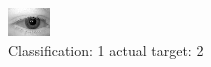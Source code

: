 \begin{figure}[h!]
\begin{center}
\includegraphics[width=0.60\columnwidth]{figures/ID509_class_1_target_2.png}
\end{center}
\caption{ Classification: 1 actual target: 2}
\label{fig:ID509_class_1_target_2}
\end{figure}
